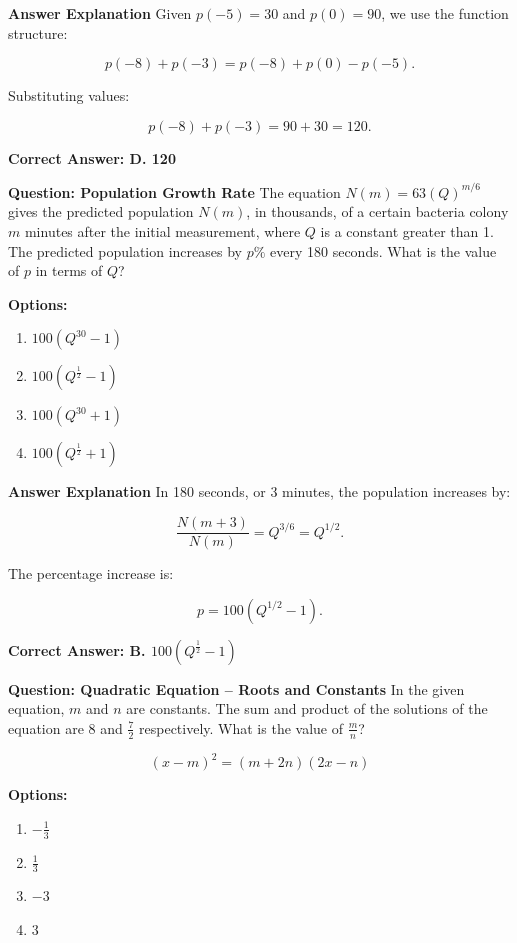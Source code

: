 \documentclass{beamer}
\begin{document}
\begin{frame}{\textbf{Answer Explanation}}
    Given \(p(-5) = 30\) and \(p(0) = 90\), we use the function structure:

    \[
    p(-8) + p(-3) = p(-8) + p(0) - p(-5).
    \]

    Substituting values:

    \[
    p(-8) + p(-3) = 90 + 30 = 120.
    \]

    \textbf{Correct Answer: D. 120}
\end{frame}
\begin{frame}{\textbf{Question: Population Growth Rate}}
    The equation \(N(m) = 63(Q)^{m/6}\) gives the predicted population \(N(m)\), in thousands, of a certain bacteria colony \(m\) minutes after the initial measurement, where \(Q\) is a constant greater than 1. The predicted population increases by \(p\%\) every 180 seconds. What is the value of \(p\) in terms of \(Q\)?

    \textbf{Options:}
    \begin{enumerate}
        \item[A] \(100 \left(Q^{30} - 1\right)\)
        \item[B] \(100 \left(Q^{\frac{1}{2}} - 1\right)\)
        \item[C] \(100 \left(Q^{30} + 1\right)\)
        \item[D] \(100 \left(Q^{\frac{1}{2}} + 1\right)\)
    \end{enumerate}
\end{frame}

\begin{frame}{\textbf{Answer Explanation}}
    In 180 seconds, or 3 minutes, the population increases by:

    \[
    \frac{N(m+3)}{N(m)} = Q^{3/6} = Q^{1/2}.
    \]

    The percentage increase is:

    \[
    p = 100(Q^{1/2} - 1).
    \]

    \textbf{Correct Answer: B. \(100 \left(Q^{\frac{1}{2}} - 1\right)\)}
\end{frame}





\begin{frame}{\textbf{Question: Quadratic Equation – Roots and Constants}}
    In the given equation, \(m\) and \(n\) are constants. The sum and product of the solutions of the equation are \(8\) and \(\frac{7}{2}\) respectively. What is the value of \( \frac{m}{n} \)?

    \[
    (x - m)^2 = (m + 2n)(2x - n)
    \]

    \vspace{0.3cm}
    \textbf{Options:}
    \begin{enumerate}
        \item[A] \(-\frac{1}{3}\)
        \item[B] \(\frac{1}{3}\)
        \item[C] \(-3\)
        \item[D] \(3\)
    \end{enumerate}
\end{frame}
\end{document}
